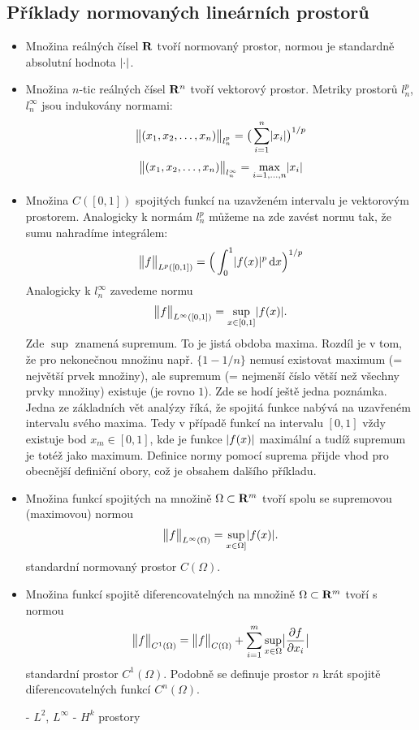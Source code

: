    \subsection{Příklady normovaných lineárních prostorů}
   \begin{itemize}
    \item Množina reálných čísel ${\rm\bf R}$ tvoří normovaný prostor, normou je standardně absolutní hodnota $\lvert\cdot\rvert$.
    \item Množina $n$-tic reálných čísel ${\rm\bf R}^n$ tvoří vektorový prostor. Metriky prostorů $l^p_n$, $l^\infty_n$ jsou indukovány normami:
          \[
                \bigl\Vert(x_1,x_2,\dots,x_n)\bigr\Vert_{l^p_n}=\big(\sum_{i=1}^n \lvert x_i\rvert\big)^{1/p}
          \]
          \[
                \bigl\Vert(x_1,x_2,\dots,x_n)\bigr\Vert_{l^\infty_n}=\max_{i=1,\dots,n} \lvert x_i\rvert
          \]
    \item Množina $C([0,1])$ spojitých funkcí na uzavženém intervalu je vektorovým prostorem. Analogicky k normám $l^p_n$ můžeme na zde zavést
          normu tak, že sumu nahradíme integrálem:
          \[
                \bigl\Vert f\bigr\Vert_{L^p([0,1])} = \Big( \int_0^1 \lvert f(x)\rvert^p \,{\rm d} x \Big)^{1/p} 
          \]
          Analogicky k $l^\infty_n$ zavedeme normu
          \[
                \bigl\Vert f\bigr\Vert_{L^\infty([0,1])} = \sup_{x\in[0,1]} \lvert f(x)\rvert.
          \]
          Zde $\sup$ znamená supremum. To je jistá obdoba maxima. Rozdíl je v tom, že pro nekonečnou množinu např. 
        $\{ 1-1/n\}$ nemusí existovat maximum (= největší prvek množiny), ale supremum (= nejmenší číslo větší než všechny prvky množiny) existuje (je rovno $1$). Zde se hodí ještě jedna poznámka. Jedna ze základních vět
        analýzy říká, že spojitá funkce nabývá na uzavřeném intervalu svého maxima. Tedy v případě funkcí na 
        intervalu $[0,1]$ vždy existuje bod $x_m\in [0,1]$, kde je funkce $\lvert f(x)\rvert$ maximální a tudíž supremum
         je totéž jako maximum. Definice normy pomocí suprema přijde vhod pro obecnější definiční obory, což
        je obsahem dalšího příkladu.
   \item Množina funkcí spojitých na množině $\Omega\subset {\rm\bf R}^m$ tvoří spolu se supremovou (maximovou) normou
          \[
                \bigl\Vert f\bigr\Vert_{L^\infty(\Omega)} = \sup_{x\in \Omega]} \lvert f(x)\rvert.
          \]
          standardní normovaný prostor $C(\Omega)$.
   \item Množina funkcí spojitě diferencovatelných na množině $\Omega\subset {\rm\bf R}^m$ tvoří s normou
        \[
                \bigl\Vert f\bigr\Vert_{C^1(\Omega)}=\bigl\Vert f\bigr\Vert_{C(\Omega)} 
                        + \sum_{i=1}^m \sup_{x\in \Omega} \bigl\lvert\frac{\partial f}{\partial x_i}\bigr\rvert
        \]
        standardní prostor $C^1(\Omega)$. Podobně se definuje prostor $n$ krát spojitě diferencovatelných funkcí 
        $C^n(\Omega)$.
        
          - $L^2$, $L^\infty$
          - $H^k$ prostory

   \end{itemize}

